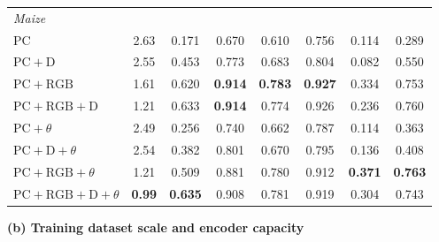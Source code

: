 \documentclass[10pt,twocolumn,letterpaper]{article}
\begin{document}
\begin{table}[t]
\begin{minipage}[t]{0.52\textwidth}
{\begin{tabular}{l c cccccc}
    \multicolumn{8}{l}{\emph{Maize}} \\
    PC & 2.63 & 0.171 & 0.670 & 0.610 & 0.756 & 0.114 & 0.289 \\
    $\mathrm{PC}+\mathrm{D}$ & 2.55 & 0.453 & 0.773 & 0.683 & 0.804 & 0.082 & 0.550 \\
    $\mathrm{PC}+\mathrm{RGB}$ & 1.61 & 0.620 & \textbf{0.914} & \textbf{0.783} & \textbf{0.927} & 0.334 & 0.753 \\
    $\mathrm{PC}+\mathrm{RGB}+\mathrm{D}$ & 1.21 & 0.633 & \textbf{0.914} & 0.774 & 0.926 & 0.236 & 0.760 \\
    $\mathrm{PC}+\theta$ & 2.49 & 0.256 & 0.740 & 0.662 & 0.787 & 0.114 & 0.363 \\
    $\mathrm{PC}+\mathrm{D}+\theta$ & 2.54 & 0.382 & 0.801 & 0.670 & 0.795 & 0.136 & 0.408 \\
    $\mathrm{PC}+\mathrm{RGB}+\theta$ & 1.21 & 0.509 & 0.881 & 0.780 & 0.912 & \textbf{0.371} & \textbf{0.763} \\
    $\mathrm{PC}+\mathrm{RGB}+\mathrm{D}+\theta$ & \textbf{0.99} & \textbf{0.635} & 0.908 & 0.781 & 0.919 & 0.304 & 0.743 \\
    \bottomrule
  \end{tabular}}
  \end{minipage}\hfill
  \begin{minipage}[t]{0.45\textwidth}
    \centering
    \textbf{(b) Training dataset scale and encoder capacity}\\[3pt]
    \setlength{\tabcolsep}{3.0pt}
\end{minipage}
\end{table}
\end{document}
